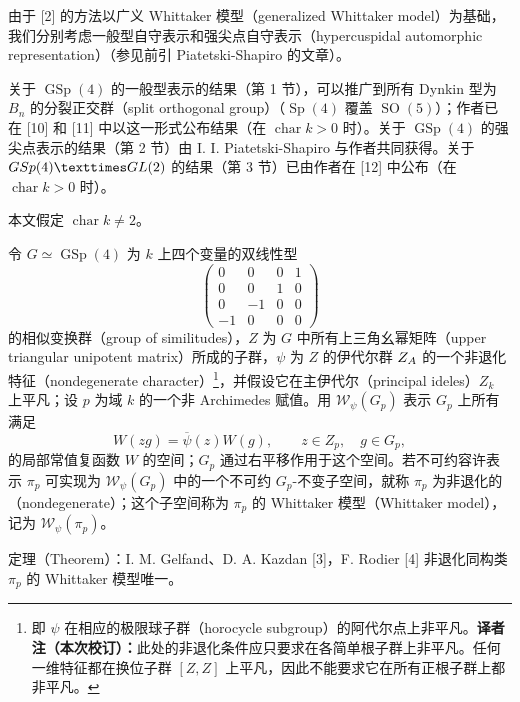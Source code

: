 由于 [2] 的方法以广义 Whittaker 模型（generalized Whittaker model）为基础，我们分别考虑一般型自守表示和强尖点自守表示（hypercuspidal automorphic representation）（参见前引 Piatetski-Shapiro 的文章）。

关于 $\operatorname{GSp}(4)$ 的一般型表示的结果（第 1 节），可以推广到所有 Dynkin 型为 $B_n$ 的分裂正交群（split orthogonal group）（$\operatorname{Sp}(4)$ 覆盖 $\operatorname{SO}(5)$）；作者已在 [10] 和 [11] 中以这一形式公布结果（在 $\operatorname{char}k>0$ 时）。关于 $\operatorname{GSp}(4)$ 的强尖点表示的结果（第 2 节）由 I. I. Piatetski-Shapiro 与作者共同获得。关于 $\operatorname{GSp}(4)\times\GL(2)$ 的结果（第 3 节）已由作者在 [12] 中公布（在 $\operatorname{char}k>0$ 时）。

本文假定 $\operatorname{char}k\ne2$。

令 $G\simeq\operatorname{GSp}(4)$ 为 $k$ 上四个变量的双线性型
\[
 \begin{pmatrix}0&0&0&1\\0&0&1&0\\0&-1&0&0\\-1&0&0&0\end{pmatrix}
\]
的相似变换群（group of similitudes），$Z$ 为 $G$ 中所有上三角幺幂矩阵（upper triangular unipotent matrix）所成的子群，$\psi$ 为 $Z$ 的伊代尔群 $Z_A$ 的一个非退化特征（nondegenerate character）\footnote{即 $\psi$ 在相应的极限球子群（horocycle subgroup）的阿代尔点上非平凡。\textbf{译者注（本次校订）：}此处的非退化条件应只要求在各简单根子群上非平凡。任何一维特征都在换位子群 $[Z,Z]$ 上平凡，因此不能要求它在所有正根子群上都非平凡。}，并假设它在主伊代尔（principal ideles）$Z_k$ 上平凡；设 $p$ 为域 $k$ 的一个非 Archimedes 赋值。用 $\mathcal W_\psi(G_p)$ 表示 $G_p$ 上所有满足
\begin{equation}
 W(zg)=\overline{\psi}(z)W(g),\qquad z\in Z_p,\quad g\in G_p,
 \tag{1.1}
\end{equation}
的局部常值复函数 $W$ 的空间；$G_p$ 通过右平移作用于这个空间。若不可约容许表示 $\pi_p$ 可实现为 $\mathcal W_\psi(G_p)$ 中的一个不可约 $G_p$-不变子空间，就称 $\pi_p$ 为非退化的（nondegenerate）；这个子空间称为 $\pi_p$ 的 Whittaker 模型（Whittaker model），记为 $\mathcal W_\psi(\pi_p)$。

\begin{originaltheorem}{定理（Theorem）：I. M. Gelfand、D. A. Kazdan [3]，F. Rodier [4]}
非退化同构类 $\pi_p$ 的 Whittaker 模型唯一。
\end{originaltheorem}

